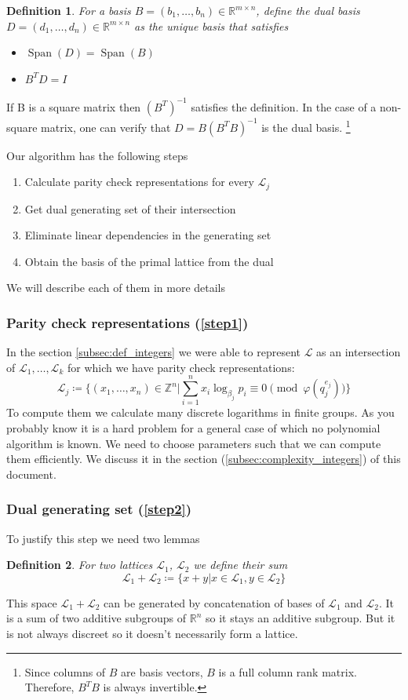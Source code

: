\documentclass[12pt]{article}
\newcommand{\ZZ}{\mathbb{Z}}
\newcommand{\LL}{\mathcal{L}}
\DeclareMathOperator{\Span}{Span}
\newtheorem{definition}{Definition}
\begin{document}
\begin{definition}
    For a basis $B = (b_{1}, \dots, b_{n}) \in \mathbb{R}^{m \times n}$, define the dual basis $D = (d_{1}, \dots, d_{n}) \in \mathbb{R}^{m \times n}$ as the unique basis that satisfies
    \begin{itemize}
        \item $\Span(D) = \Span(B)$
        \item $B^{T}D = I$
    \end{itemize}
\end{definition}
If B is a square matrix then $(B^{T})^{-1}$ satisfies the definition. In the case of a non-square matrix, one can verify that $D = B(B^{T}B)^{-1}$ is the dual basis. \footnote{Since columns of $B$ are basis vectors, $B$ is a full column rank matrix. Therefore, $B^{T}B$ is always invertible.}

 Our algorithm \label{algorithm} has the following steps
\begin{enumerate}
    \item \label{step1} Calculate parity check representations for every $\LL_{j}$
    \item \label{step2} Get dual generating set of their intersection
    \item \label{step3} Eliminate linear dependencies in the generating set
    \item \label{step4} Obtain the basis of the primal lattice from the dual
\end{enumerate}
We will describe each of them in more details

\subsubsection{Parity check representations (\ref{step1})}
\label{subsubsec:parity_check_repr}
In the section \ref{subsec:def_integers} we were able to represent $\LL$ as an intersection of $\LL_{1}, \dots, \LL_{k}$ for which we have parity check representations:
\[
    \LL_{j} \coloneqq \{(x_{1}, \dots, x_{n}) \in \ZZ^{n} | \sum_{i=1}^{n}x_{i}\log_{\beta_{j}}p_{i}\equiv 0 \pmod{\varphi(q_{j}^{e_{j}})}\}
\]
To compute them we calculate many discrete logarithms in finite groups. As you probably know it is a hard problem for a general case of which no polynomial algorithm is known. We need to choose parameters such that we can compute them efficiently. We discuss it in the section (\ref{subsec:complexity_integers}) of this document.

\subsubsection{Dual generating set (\ref{step2})}
\label{subsubsec:dual_gen_set}
To justify this step we need two lemmas
\begin{definition}
    For two lattices $\LL_1$, $\LL_2$ we define their sum
\[
    \LL_1 + \LL_2 \coloneqq \{x + y | x \in \LL_1, y \in \LL_2\}
\]
\end{definition}
This space $\LL_{1} + \LL_{2}$ can be generated by concatenation of bases of $\LL_{1}$ and $\LL_{2}$. It is a sum of two additive subgroups of $\mathbb{R}^{n}$ so it stays an additive subgroup. But it is not always discreet so it doesn't necessarily form a lattice.
\end{document}
